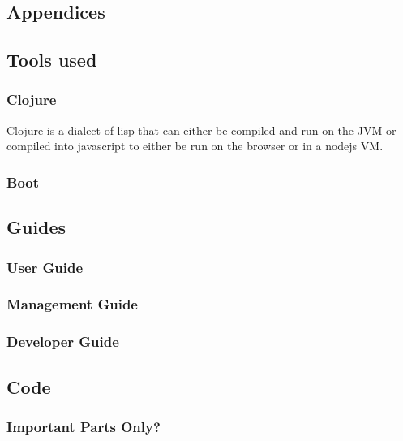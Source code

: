 \documentclass{report}
\begin{document}
\begin{appendices}
\chapter{Appendices}
\section{Tools used}
\subsection{Clojure}
Clojure is a dialect of lisp that can either be compiled and run on the JVM or
compiled into javascript to either be run on the browser or in a nodejs VM.
\subsection{Boot}
\section{Guides}
\subsection{User Guide}
\subsection{Management Guide}
\subsection{Developer Guide}
\section{Code}
\subsection{Important Parts Only?}
\end{appendices}

 
\end{document}
